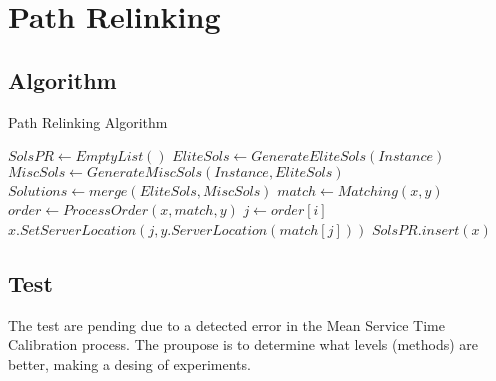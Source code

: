 \section{Path Relinking}
\subsection{Algorithm}
\begin{frame}{Path Relinking Algorithm}{}
  \footnotesize{
  \begin{algorithm}
    \hline \vspace{3pt}
    \caption{Path Relinking}\label{proc_rel}
    \vspace{3pt} \hline
    \begin{algorithmic}[0]
      \State $SolsPR \gets EmptyList()$
      \State $EliteSols \gets GenerateEliteSols(Instance)$
      \State $MiscSols \gets GenerateMiscSols(Instance,EliteSols)$
      \State $Solutions \gets merge(EliteSols,MiscSols)$
      \State $match \gets Matching(x,y)$
      \State $order \gets ProcessOrder(x,match,y)$
      \State $j \gets order[i]$
      \State $x.SetServerLocation(j,y.ServerLocation(match[j]))$
      \State $SolsPR.insert(x)$
      \EndIf \EndFor \EndFor
      \EndProcedure
      \hline
    \end{algorithmic}
  \end{algorithm}}
\end{frame}

\subsection{Test}
\begin{frame}
  The test are pending due to a detected error in the Mean Service Time 
  Calibration process.
  The proupose is to determine what levels (methods) are better,
  making a desing of experiments.
\end{frame}
